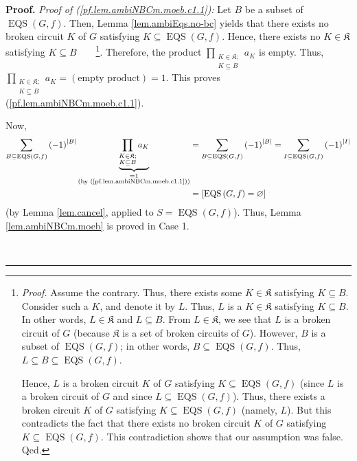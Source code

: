 \documentclass[numbers=enddot,12pt,final,onecolumn,notitlepage]{scrartcl}%
\theoremstyle{definition}
\newenvironment{proof}[1][Proof]{\noindent\textbf{#1.} }{\ \rule{0.5em}{0.5em}}
\newenvironment{verlong}{}{}
\newenvironment{vershort}{}{}
\let\sumnonlimits\sum
\let\prodnonlimits\prod
\renewcommand{\sum}{\sumnonlimits\limits}
\renewcommand{\prod}{\prodnonlimits\limits}
\begin{document}
\begin{proof}
\begin{verlong}
\textit{Proof of (\ref{pf.lem.ambiNBCm.moeb.c1.1}):} Let $B$ be a subset of
$\operatorname*{EQS}\left(  G,f\right)  $. Then, Lemma \ref{lem.ambiEqs.no-bc}
yields that there exists no broken circuit $K$ of $G$ satisfying
$K\subseteq\operatorname*{EQS}\left(  G,f\right)  $. Hence, there exists no
$K\in\mathfrak{K}$ satisfying $K\subseteq B$\ \ \ \ \footnote{\textit{Proof.}
Assume the contrary. Thus, there exists some $K\in\mathfrak{K}$ satisfying
$K\subseteq B$. Consider such a $K$, and denote it by $L$. Thus, $L$ is a
$K\in\mathfrak{K}$ satisfying $K\subseteq B$. In other words, $L\in
\mathfrak{K}$ and $L\subseteq B$. From $L\in\mathfrak{K}$, we see that $L$ is
a broken circuit of $G$ (because $\mathfrak{K}$ is a set of broken circuits of
$G$). However, $B$ is a subset of $\operatorname*{EQS}\left(  G,f\right)  $;
in other words, $B\subseteq\operatorname*{EQS}\left(  G,f\right)  $. Thus,
$L\subseteq B\subseteq\operatorname*{EQS}\left(  G,f\right)  $.
\par
Hence, $L$ is a broken circuit $K$ of $G$ satisfying $K\subseteq
\operatorname*{EQS}\left(  G,f\right)  $ (since $L$ is a broken circuit of $G$
and since $L\subseteq\operatorname*{EQS}\left(  G,f\right)  $). Thus, there
exists a broken circuit $K$ of $G$ satisfying $K\subseteq\operatorname*{EQS}%
\left(  G,f\right)  $ (namely, $L$). But this contradicts the fact that there
exists no broken circuit $K$ of $G$ satisfying $K\subseteq\operatorname*{EQS}%
\left(  G,f\right)  $. This contradiction shows that our assumption was false.
Qed.}. Therefore, the product $\prod_{\substack{K\in\mathfrak{K};\\K\subseteq
B}}a_{K}$ is empty. Thus, $\prod_{\substack{K\in\mathfrak{K};\\K\subseteq
B}}a_{K}=\left(  \text{empty product}\right)  =1$. This proves
(\ref{pf.lem.ambiNBCm.moeb.c1.1}).
\end{verlong}

\begin{vershort}
Now,
\begin{align*}
\sum_{B\subseteq\operatorname*{EQS}\left(  G,f\right)  }\left(  -1\right)
^{\left\vert B\right\vert }\underbrace{\prod_{\substack{K\in\mathfrak{K}%
;\\K\subseteq B}}a_{K}}_{\substack{=1\\\text{(by
(\ref{pf.lem.ambiNBCm.moeb.c1.1}))}}}  &  =\sum_{B\subseteq\operatorname*{EQS}%
\left(  G,f\right)  }\left(  -1\right)  ^{\left\vert B\right\vert }%
=\sum_{I\subseteq\operatorname*{EQS}\left(  G,f\right)  }\left(  -1\right)
^{\left\vert I\right\vert }\\
&  =\left[  \operatorname*{EQS}\left(  G,f\right)  =\varnothing\right]
\end{align*}
(by Lemma \ref{lem.cancel}, applied to $S=\operatorname*{EQS}\left(
G,f\right)  $). Thus, Lemma \ref{lem.ambiNBCm.moeb} is proved in Case 1.
\end{vershort}


\end{proof}
\end{document}
